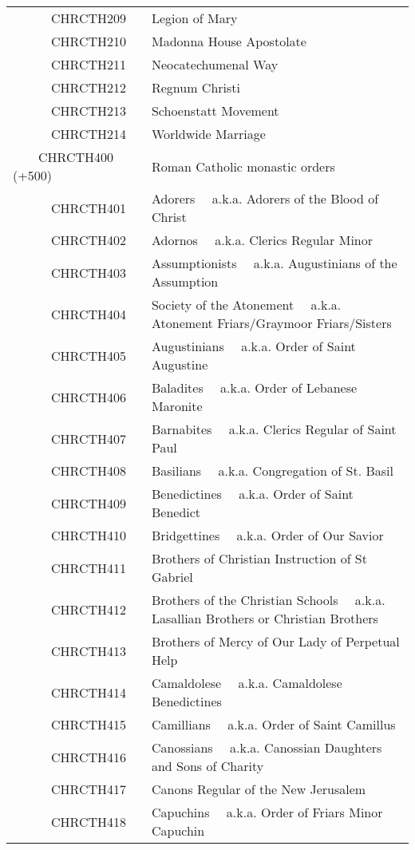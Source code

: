 \documentclass[12pt]{article}
\begin{document}
\begin{tiny}
\begin{center}
\begin{longtable}{|l|l|}
~~~~~~CHRCTH209 & Legion of Mary \\
~~~~~~CHRCTH210 & Madonna House Apostolate \\
~~~~~~CHRCTH211 & Neocatechumenal Way \\
~~~~~~CHRCTH212 & Regnum Christi \\
~~~~~~CHRCTH213 & Schoenstatt Movement \\
~~~~~~CHRCTH214 & Worldwide Marriage \\
~~~~CHRCTH400 (+500) & Roman Catholic monastic orders \\
~~~~~~CHRCTH401 & Adorers 	~~a.k.a. Adorers of the Blood of Christ \\
~~~~~~CHRCTH402 & Adornos 	~~a.k.a. Clerics Regular Minor \\
~~~~~~CHRCTH403 & Assumptionists 	~~a.k.a. Augustinians of the Assumption \\
~~~~~~CHRCTH404 & Society of the Atonement 	~~a.k.a. Atonement Friars/Graymoor Friars/Sisters \\
~~~~~~CHRCTH405 & Augustinians 	~~a.k.a. Order of Saint Augustine \\
~~~~~~CHRCTH406 & Baladites 	~~a.k.a. Order of Lebanese Maronite \\
~~~~~~CHRCTH407 & Barnabites 	~~a.k.a. Clerics Regular of Saint Paul \\
~~~~~~CHRCTH408 & Basilians 	~~a.k.a. Congregation of St. Basil \\
~~~~~~CHRCTH409 & Benedictines 	~~a.k.a. Order of Saint Benedict \\
~~~~~~CHRCTH410 & Bridgettines 	~~a.k.a. Order of Our Savior \\
~~~~~~CHRCTH411 & Brothers of Christian Instruction of St Gabriel \\
~~~~~~CHRCTH412 & Brothers of the Christian Schools 	~~a.k.a. Lasallian Brothers or Christian Brothers \\
~~~~~~CHRCTH413 & Brothers of Mercy of Our Lady of Perpetual Help \\
~~~~~~CHRCTH414 & Camaldolese 	~~a.k.a. Camaldolese Benedictines \\
~~~~~~CHRCTH415 & Camillians 	~~a.k.a. Order of Saint Camillus \\
~~~~~~CHRCTH416 & Canossians 	~~a.k.a. Canossian Daughters and Sons of Charity \\
~~~~~~CHRCTH417 & Canons Regular of the New Jerusalem \\
~~~~~~CHRCTH418 & Capuchins 	~~a.k.a. Order of Friars Minor Capuchin \\

\end{longtable}
\end{center}
\end{tiny}
\end{document}
